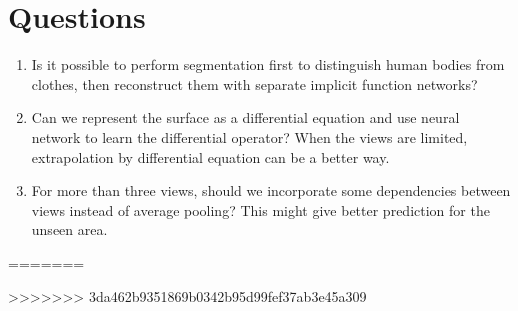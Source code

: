 \documentclass{article}
\begin{document}
	\section{Questions}
	\begin{enumerate}
		\item Is it possible to perform segmentation first to distinguish human bodies from clothes, then reconstruct them with separate implicit function networks?
		\item Can we represent the surface as a differential equation and use neural network to learn the differential operator? When the views are limited, extrapolation by differential equation can be a better way.
		\item For more than three views, should we incorporate some dependencies between views instead of average pooling? This might give better prediction for the unseen area.
	\end{enumerate}
=======
	
>>>>>>> 3da462b9351869b0342b95d99fef37ab3e45a309
\end{document}
